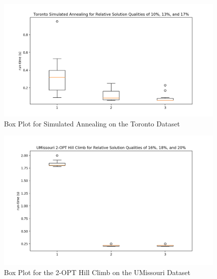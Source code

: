 \documentclass[format=sigconf]{acmart}
\begin{document}
\begin{figure}[htbp]
    \centerline{\includegraphics[scale=.5]{graphs/Toronto_LS2_Box.png}}
    \caption{Box Plot for Simulated Annealing on the Toronto Dataset}
    \label{fig10}
\end{figure}

\begin{figure}[htbp]
    \centerline{\includegraphics[scale=.5]{graphs/UMissouri_LS1_Box.png}}
    \caption{Box Plot for the 2-OPT Hill Climb on the UMissouri Dataset}
    \label{fig11}
\end{figure}
\end{document}
